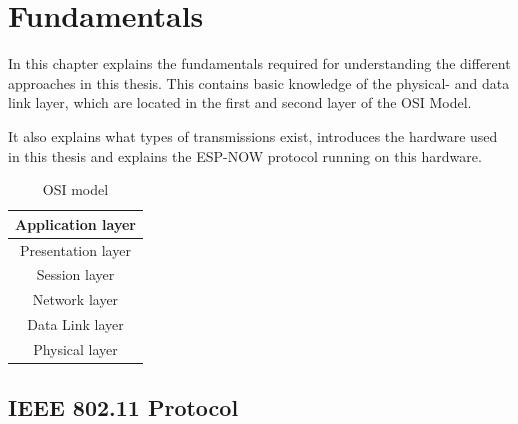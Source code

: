 \chapter{Fundamentals}
\label{sec:fundamentals}


In this chapter explains the fundamentals required for understanding the different approaches 
in this thesis.
This contains basic knowledge of the physical- and data link layer,
which are located in the first and second layer of the \ac{OSI} Model.

It also explains what types of transmissions exist, 
introduces the hardware used in this thesis and explains the ESP-NOW protocol running on this hardware.

\begin{table}[h]
	\centering
	\begin{tabular}{ |c| } 
		\hline
		Application layer\\
		\hline
		Presentation layer\\
		\hline
		Session layer\\
		\hline
		Network layer\\
		\hline
		\cellcolor{yellow!25}Data Link layer\\
		\hline
		\cellcolor{yellow!25}Physical layer\\
		\hline
	\end{tabular}
	\caption{\ac{OSI} model}
	\label{tab:OSI}
\end{table}

\section{IEEE 802.11 Protocol}

